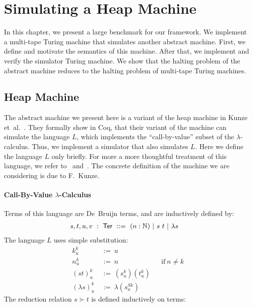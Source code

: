 \chapter{Simulating a Heap Machine}
\label{chap:heap}

\newcommand{\subst}[3]{{#1}^{#2}_{#3}}
\newcommand{\Ter}{\MS{Ter}}
\newcommand{\red}{\succ}


In this chapter, we present a large benchmark for our framework.  We implement a multi-tape Turing machine that simulates another abstract machine.
First, we define and motivate the semantics of this machine.  After that, we implement and verify the simulator Turing machine.  We show that the
halting problem of the abstract machine reduces to the halting problem of multi-tape Turing machines.

\section{Heap Machine}
\label{sec:heap}

The abstract machine we present here is a variant of the heap machine in Kunze et~al.~\cite{KunzeEtAl:2018:Formal}.  They formally show in Coq, that
their variant of the machine can simulate the language $L$, which implements the ``call-by-value'' subset of the $\lambda$-calculus.  Thus, we
implement a simulator that also simulates $L$.  Here we define the language $L$ only briefly.  For more a more thoughtful treatment of this language,
we refer to~\cite{forster2017weak} and~\cite{KunzeEtAl:2018:Formal}.  The concrete definition of the machine we are considering is due to F.~Kunze.


\subsubsection{Call-By-Value $\lambda$-Calculus}
\label{sec:L}

Terms of this language are De~Bruijn terms, and are inductively defined by:
\begin{align*}
  s,t,u,v &~:~\Ter~::=~ (n:\Nat) ~|~ s~t ~|~ \lambda s
\end{align*}
The language $L$ uses simple substitution:
\begin{align*}
  \subst kku &~:=~u \\
  \subst nku &~:=~n &&\text{if}~n\neq k \\
  \subst{(st)}ku &~:=~(\subst sku)(\subst tku) \\
  \subst{(\lambda s)}ku &~:=~\lambda(\subst s{Sk}u)
\end{align*}
The reduction relation $s \red t$ is defined inductively on terms:


